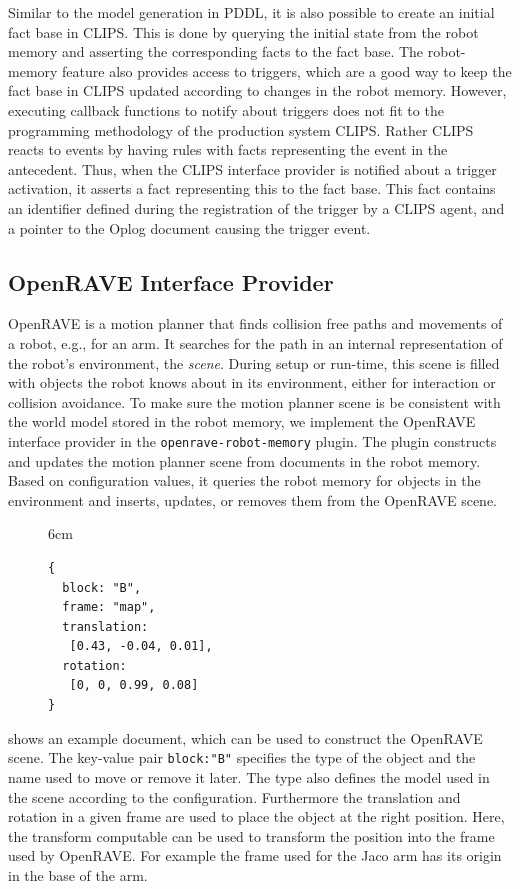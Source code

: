 Similar to the model generation in PDDL, it is also possible to create
an initial fact base in CLIPS. This is done by querying the initial
state from the robot memory and asserting the corresponding facts to
the fact base. The robot-memory feature also provides access to
triggers, which are a good way to keep the fact base in CLIPS updated
according to changes in the robot memory. However, executing callback
functions to notify about triggers does not fit to the programming
methodology of the production system CLIPS. Rather CLIPS reacts to
events by having rules with facts representing the event in the
antecedent. Thus, when the CLIPS interface provider is notified about
a trigger activation, it asserts a fact representing this to the fact
base. This fact contains an identifier defined during the registration
of the trigger by a CLIPS agent, and a pointer to the Oplog document
causing the trigger event.

\subsection{OpenRAVE Interface Provider}
\label{sec:impl-openrave}
OpenRAVE is a motion planner that finds collision free paths and
movements of a robot, e.g., for an arm. It searches for the path in an
internal representation of the robot's environment, the
\emph{scene}. During setup or run-time, this scene is filled with
objects the robot knows about in its environment, either for
interaction or collision avoidance. To make sure the motion
planner scene is be consistent with the world model stored in the
robot memory, we implement the OpenRAVE interface provider in the
\texttt{openrave-robot-memory} plugin. The plugin constructs and
updates the motion planner scene from documents in the robot
memory. Based on configuration values, it queries the robot memory for
objects in the environment and inserts, updates, or removes them from
the OpenRAVE scene.
\begin{figure}{6cm}
  \vspace{-0.8cm}
\begin{lstlisting}[style=SmallJSON,
  caption={Document used to construct the OpenRAVE scene},
  label=lst:openrave,
  framexleftmargin=5pt, xleftmargin=0pt,
 morekeywords={}, numbers=none]
{
  block: "B",
  frame: "map",
  translation:
   [0.43, -0.04, 0.01],
  rotation:
   [0, 0, 0.99, 0.08]
}
\end{lstlisting}
\vspace{-8mm}
\end{figure}
 shows an example document, which can be used to
construct the OpenRAVE scene. The key-value pair \texttt{block:"B"}
specifies the type of the object and the name used to move or remove
it later. The type also defines the model used in the scene according
to the configuration. Furthermore the translation and rotation in a
given frame are used to place the object at the right position. Here,
the transform computable can be used to transform the position into
the frame used by OpenRAVE. For example the frame used for the Jaco
arm has its origin in the base of the arm.

